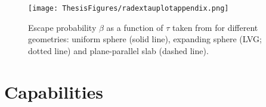 \begin{figure}[h]
\centering
\texttt{[image: ThesisFigures/radextauplotappendix.png]} %
\caption[Escape probability $\beta$ as a function of $\tau$]{Escape probability $\beta$ as a function of $\tau$ taken from \citet{2007A&A...468..627V} for different geometries: uniform sphere (solid line), expanding sphere (LVG; dotted line) and plane-parallel slab (dashed line).}
\label{radextauplot}
\end{figure}

\section{Capabilities}

